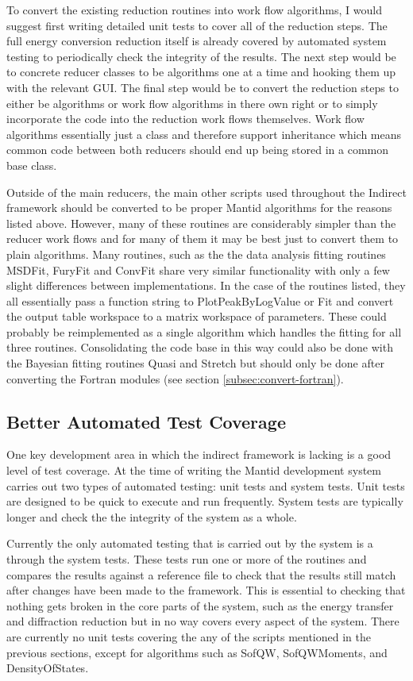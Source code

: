 \documentclass[paper=a4, fontsize=11pt]{scrartcl}	%
\numberwithin{equation}{section}															%
\numberwithin{figure}{section}																%
\numberwithin{table}{section}																%
\begin{document}
To convert the existing reduction routines into work flow algorithms, I would suggest first writing detailed unit tests to cover all of the reduction steps. The full energy conversion reduction itself is already covered by automated system testing to periodically check the integrity of the results. The next step would be to concrete reducer classes to be algorithms one at a time and hooking them up with the relevant GUI. The final step would be to convert the reduction steps to either be algorithms or work flow algorithms in there own right or to simply incorporate the code into the reduction work flows themselves. Work flow algorithms essentially just a class and therefore support inheritance which means common code between both reducers should end up being stored in a common base class.

Outside of the main reducers, the main other scripts used throughout the Indirect framework should be converted to be proper Mantid algorithms for the reasons listed above. However, many of these routines are considerably simpler than the reducer work flows and for many of them it may be best just to convert them to plain algorithms. Many routines, such as the the data analysis fitting routines MSDFit, FuryFit and ConvFit share very similar functionality with only a few slight differences between implementations. In the case of the routines listed, they all essentially pass a function string to PlotPeakByLogValue or Fit and convert the output table workspace to a matrix workspace of parameters. These could probably be reimplemented as a single algorithm which handles the fitting for all three routines. Consolidating the code base in this way could also be done with the Bayesian fitting routines Quasi and Stretch but should only be done after converting the Fortran modules (see section \ref{subsec:convert-fortran}).

\subsection{Better Automated Test Coverage}
One key development area in which the indirect framework is lacking is a good level of test coverage. At the time of writing the Mantid development system carries out two types of automated testing: unit tests and system tests. Unit tests are designed to be quick to execute and run frequently. System tests are typically longer and check the the integrity of the system as a whole.

Currently the only automated testing that is carried out by the system is a through the system tests. These tests run one or more of the routines and compares the results against a reference file to check that the results still match after changes have been made to the framework. This is essential to checking that nothing gets broken in the core parts of the system, such as the energy transfer and diffraction reduction but in no way covers every aspect of the system. There are currently no unit tests covering the any of the scripts mentioned in the previous sections, except for algorithms such as SofQW, SofQWMoments, and DensityOfStates.
\end{document}
